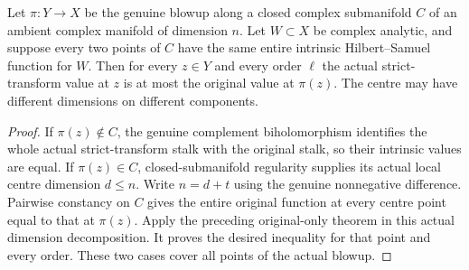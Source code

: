 \begin{theorem}
\label{hir:actual-all-point-hs-constant-smooth-centre-bennett}
\leanok
Let $\pi:Y\to X$ be the genuine blowup along a closed complex
submanifold $C$ of an ambient complex manifold of dimension $n$.
Let $W\subset X$ be complex analytic, and suppose every two
points of $C$ have the same entire intrinsic Hilbert--Samuel
function for $W$. Then for every $z\in Y$ and every order
$\ell$ the actual strict-transform value at $z$ is at most
the original value at $\pi(z)$.
The centre may have different dimensions on different components.
\end{theorem}
\begin{proof}
If $\pi(z)\notin C$, the genuine complement biholomorphism
identifies the whole actual strict-transform stalk with the
original stalk, so their intrinsic values are equal.
If $\pi(z)\in C$, closed-submanifold regularity supplies its
actual local centre dimension $d\le n$. Write $n=d+t$ using
the genuine nonnegative difference. Pairwise constancy on $C$
gives the entire original function at every centre point equal
to that at $\pi(z)$. Apply the preceding original-only theorem
in this actual dimension decomposition. It proves the desired
inequality for that point and every order. These two cases
cover all points of the actual blowup.
\end{proof}

